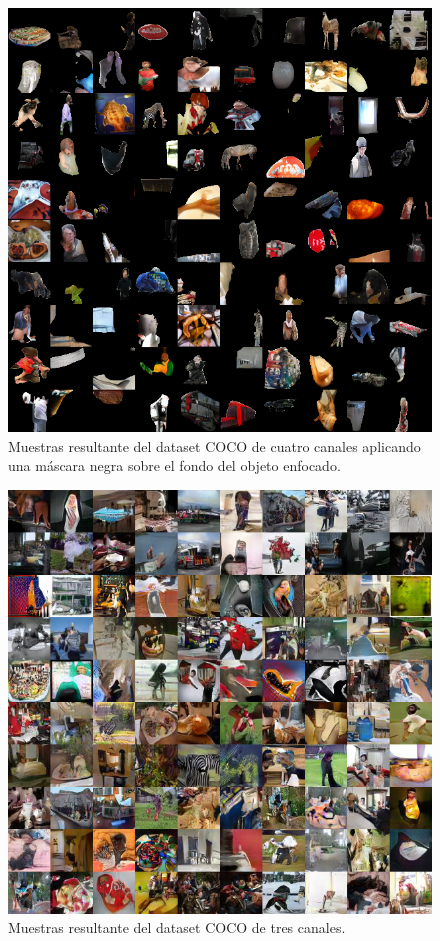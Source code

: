 \documentclass[spanish]{report}
\begin{document}
\begin{figure}[h]
\centering
 \includegraphics[width=\linewidth]{resultados/coco_4chan_mask.png}
   \caption{Muestras resultante del dataset COCO de cuatro canales aplicando una máscara negra sobre el fondo del objeto enfocado.}
  \label{fig:resultado_coco3}
\end{figure}

\begin{figure}[h]
\centering
 \includegraphics[width=\linewidth]{resultados/coco_3chan.png}
   \caption{Muestras resultante del dataset COCO de tres canales.}
  \label{fig:resultado_coco4}
\end{figure}
\end{document}
